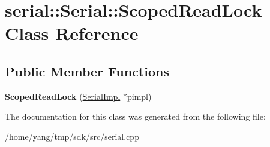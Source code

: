 \hypertarget{classserial_1_1_serial_1_1_scoped_read_lock}{}\section{serial\+:\+:Serial\+:\+:Scoped\+Read\+Lock Class Reference}
\label{classserial_1_1_serial_1_1_scoped_read_lock}
\subsection*{Public Member Functions}
\begin{DoxyCompactItemize}
\item 
{\bfseries Scoped\+Read\+Lock} (\hyperlink{classserial_1_1serial_1_1_serial_1_1_serial_impl}{Serial\+Impl} $\ast$pimpl)\hypertarget{classserial_1_1_serial_1_1_scoped_read_lock_a54f59663807d8adfe6db712ee6103503}{}\label{classserial_1_1_serial_1_1_scoped_read_lock_a54f59663807d8adfe6db712ee6103503}

\end{DoxyCompactItemize}


The documentation for this class was generated from the following file\+:\begin{DoxyCompactItemize}
\item 
/home/yang/tmp/sdk/src/serial.\+cpp\end{DoxyCompactItemize}
